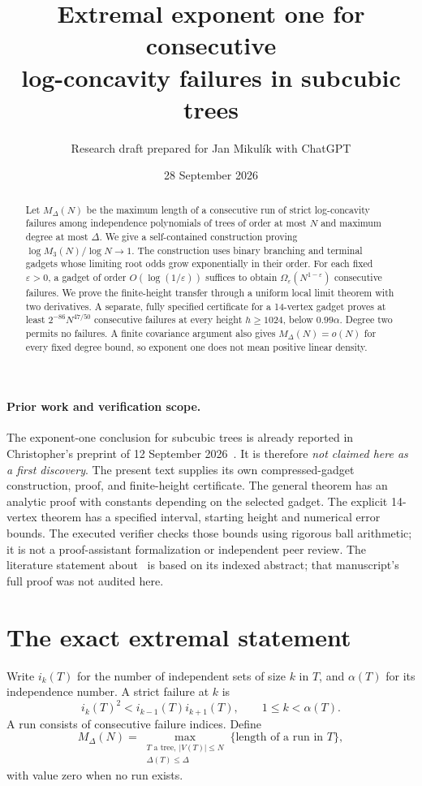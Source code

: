 \documentclass[11pt]{article}
\title{Extremal exponent one for consecutive\\log-concavity failures in subcubic trees}
\author{Research draft prepared for Jan Mikul\'ik with ChatGPT}
\date{28 September 2026}
\begin{document}
\maketitle
\begin{abstract}
Let $M_\Delta(N)$ be the maximum length of a consecutive run of strict
log-concavity failures among independence polynomials of trees of order
at most $N$ and maximum degree at most $\Delta$. We give a self-contained
construction proving $\log M_3(N)/\log N\to1$. The construction uses
binary branching and terminal gadgets whose limiting root odds grow
exponentially in their order. For each fixed $\varepsilon>0$, a gadget
of order $O(\log(1/\varepsilon))$ suffices to obtain
$\Omega_\varepsilon(N^{1-\varepsilon})$ consecutive failures.
We prove the finite-height transfer through a uniform local limit theorem
with two derivatives. A separate, fully specified certificate for a
14-vertex gadget proves at least $2^{-86}N^{47/50}$ consecutive failures
at every height $h\ge1024$, below $0.99\alpha$. Degree two permits no
failures. A finite covariance argument also gives $M_\Delta(N)=o(N)$
for every fixed degree bound, so exponent one does not mean positive
linear density.
\end{abstract}

\paragraph{Prior work and verification scope.}
The exponent-one conclusion for subcubic trees is already reported in
Christopher's preprint of 12 September 2026~\cite{Christopher}.
It is therefore \emph{not claimed here as a first discovery}.
The present text supplies its own compressed-gadget construction,
proof, and finite-height certificate. The general theorem has an analytic
proof with constants depending on the selected gadget. The explicit
14-vertex theorem has a specified interval, starting height and numerical
error bounds. The executed verifier checks those bounds using rigorous
ball arithmetic; it is not a proof-assistant formalization or independent
peer review. The literature statement about~\cite{Christopher} is based
on its indexed abstract; that manuscript's full proof was not audited here.

\section{The exact extremal statement}
Write $i_k(T)$ for the number of independent sets of size $k$ in $T$,
and $\alpha(T)$ for its independence number. A strict failure at $k$ is
\[
 i_k(T)^2<i_{k-1}(T)i_{k+1}(T),\qquad 1\le k<\alpha(T).
\]
A run consists of consecutive failure indices. Define
\[
 M_\Delta(N)=\max_{\substack{T\text{ a tree},\ |V(T)|\le N\\
                                  \Delta(T)\le\Delta}}
                  \{\text{length of a run in }T\},
\]
with value zero when no run exists.
\end{document}
